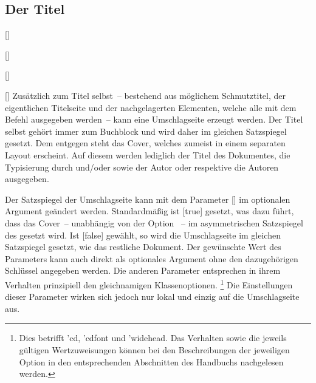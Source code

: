 \documentclass[%
  english,ngerman,%
  headings=optiontoheadandtoc,captions=tableheading,numbers=noenddot,%
  chapterpage,cdfoot,%
]{tudscrman}
\begin{document}
\subsection{Der Titel}\label{sec:title}
\begin{Declaration}{}
\begin{Declaration}{[\PBoolean]}
\begin{Declaration}{[\PSet]}
\begin{Declaration}{[\PSet]}
\begin{Declaration}{[\PBoolean]}
\printdeclarationlist%
%
%
Zusätzlich zum Titel selbst~-- bestehend aus möglichem Schmutztitel, der 
eigentlichen Titelseite und der nachgelagerten Elementen, welche alle mit dem 
Befehl  ausgegeben werden~-- kann eine Umschlagseite erzeugt 
werden. Der Titel selbst gehört immer zum Buchblock und wird daher im gleichen 
Satzspiegel gesetzt. Dem entgegen steht das Cover, welches zumeist in einem 
separaten Layout erscheint. Auf diesem werden lediglich der Titel des 
Dokumentes, die Typisierung durch  und/oder  sowie 
der Autor oder respektive die Autoren ausgegeben.

Der Satzspiegel der Umschlagseite kann mit dem Parameter
[\PBoolean] im optionalen Argument geändert 
werden. Standardmäßig ist [true] 
gesetzt, was dazu führt, dass das Cover~-- unabhängig von der Option 
~-- im asymmetrischen Satzspiegel des \CDs gesetzt wird. Ist 
[false] gewählt, so wird die Umschlagseite im
gleichen Satzspiegel gesetzt, wie das restliche Dokument. Der gewünschte Wert 
des Parameters kann auch direkt als optionales Argument ohne den dazugehörigen 
Schlüssel angegeben werden. Die anderen Parameter entsprechen in ihrem Verhalten 
prinzipiell den gleichnamigen Klassenoptionen.%
\footnote{%
  Dies betrifft \Option'{cd}, \Option'{cdfont} und \Option'{widehead}.
  Das Verhalten sowie die jeweils gültigen Wertzuweisungen können bei den
  Beschreibungen der jeweiligen Option in den entsprechenden Abschnitten des 
  Handbuchs nachgelesen werden.
}
Die Einstellungen dieser Parameter wirken sich jedoch nur lokal und einzig auf 
die Umschlagseite aus.
\end{Declaration}
\end{Declaration}
\end{Declaration}
\end{Declaration}
\end{Declaration}
\end{document}
